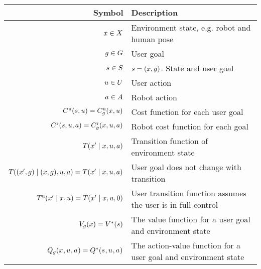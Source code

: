 \begin{appendices}

\begin{table*}[!t]
\centering
\begin{tabular}{rl}
\toprule
Symbol & Description\\ \midrule
$x \in X$ & Environment state, e.g. robot and human pose\\
$g \in G$ & User goal\\
$s \in S$ & $s = (x, g)$. State and user goal\\
$u \in U$ & User action\\
$a \in A$ & Robot action\\
$C^{\text{u}}(s, u) = C^{\text{u}}_g(x, u)$ & Cost function for each user goal\\
$C^{\text{r}}(s, u, a) = C^{\text{r}}_g(x, u, a)$ & Robot cost function for each goal\\
$T(x' \mid x, u, a)$ & Transition function of environment state\\
$T( (x', g) \mid (x, g), u, a) = T( x' \mid x, u, a)$ & User goal does not change with transition\\
$T^{\text{u}}( x' \mid x, u) = T( x' \mid x, u, 0)$ & User transition function assumes the user is in full control\\
$V_{g}(x) = V^{*}(s)$ & The value function for a user goal and environment state\\
$Q_{g}(x_{ }, u_{ }, a_{ }) = Q^{*}(s_{ }, u_{ }, a_{ })$ & The action-value function for a user goal and environment state\\

\end{tabular}
\end{table*}
\end{appendices}
